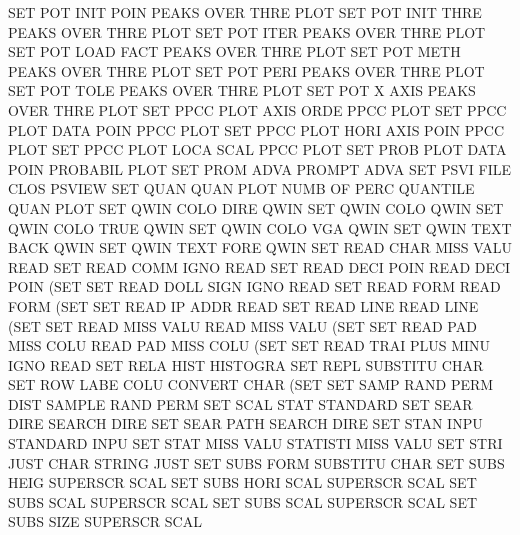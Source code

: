 SET      POT  INIT POIN                 PEAKS    OVER THRE PLOT
SET      POT  INIT THRE                 PEAKS    OVER THRE PLOT
SET      POT  ITER                      PEAKS    OVER THRE PLOT
SET      POT  LOAD FACT                 PEAKS    OVER THRE PLOT
SET      POT  METH                      PEAKS    OVER THRE PLOT
SET      POT  PERI                      PEAKS    OVER THRE PLOT
SET      POT  TOLE                      PEAKS    OVER THRE PLOT
SET      POT  X    AXIS                 PEAKS    OVER THRE PLOT
SET      PPCC PLOT AXIS ORDE            PPCC     PLOT
SET      PPCC PLOT DATA POIN            PPCC     PLOT
SET      PPCC PLOT HORI AXIS POIN       PPCC     PLOT
SET      PPCC PLOT LOCA SCAL            PPCC     PLOT
SET      PROB PLOT DATA POIN            PROBABIL PLOT
SET      PROM ADVA                      PROMPT   ADVA
SET      PSVI FILE CLOS                 PSVIEW
SET      QUAN QUAN PLOT NUMB OF   PERC  QUANTILE QUAN PLOT
SET      QWIN COLO DIRE                 QWIN
SET      QWIN COLO                      QWIN
SET      QWIN COLO TRUE                 QWIN
SET      QWIN COLO VGA                  QWIN
SET      QWIN TEXT BACK                 QWIN
SET      QWIN TEXT FORE                 QWIN
SET      READ CHAR MISS VALU            READ
SET      READ COMM IGNO                 READ
SET      READ DECI POIN                 READ     DECI POIN (SET
SET      READ DOLL SIGN IGNO            READ
SET      READ FORM                      READ     FORM (SET
SET      READ IP   ADDR                 READ
SET      READ LINE                      READ     LINE (SET
SET      READ MISS VALU                 READ     MISS VALU (SET
SET      READ PAD  MISS COLU            READ     PAD  MISS COLU (SET
SET      READ TRAI PLUS MINU IGNO       READ
SET      RELA HIST                      HISTOGRA
SET      REPL                           SUBSTITU CHAR
SET      ROW  LABE COLU                 CONVERT  CHAR (SET
SET      SAMP RAND PERM DIST            SAMPLE   RAND PERM
SET      SCAL STAT                      STANDARD
SET      SEAR DIRE                      SEARCH   DIRE
SET      SEAR PATH                      SEARCH   DIRE
SET      STAN INPU                      STANDARD INPU
SET      STAT MISS VALU                 STATISTI MISS VALU
SET      STRI JUST CHAR                 STRING   JUST
SET      SUBS FORM                      SUBSTITU CHAR
SET      SUBS HEIG                      SUPERSCR SCAL
SET      SUBS HORI SCAL                 SUPERSCR SCAL
SET      SUBS SCAL                      SUPERSCR SCAL
SET      SUBS SCAL                      SUPERSCR SCAL
SET      SUBS SIZE                      SUPERSCR SCAL
